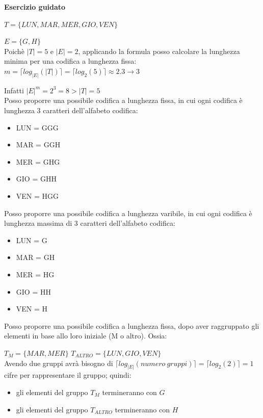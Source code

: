 \documentclass[11pt,fleqn]{book}
\begin{document}
\begin{esercizio}[1]
    \textbf{Esercizio guidato}

    $T = \{ LUN, MAR, MER, GIO, VEN \} $
    
    $E = \{ G, H \} $ \\

    Poichè $|T| = 5$ e $|E| = 2$, applicando la formula posso calcolare la lunghezza minima per una codifica a lunghezza fissa:
        $m = \lceil log_{|E|}{(|T|)} \rceil = \lceil log_2{(5)} \rceil \approx 2.3 \xrightarrow{} 3$
        
    Infatti  $|E|^{m} = 2^3 = 8 > |T| = 5$ \\

    Posso proporre una possibile codifica a lunghezza fissa, in cui ogni codifica è lunghezza 3 caratteri dell'alfabeto codifica:
    \begin{itemize}
        \item LUN = GGG
        \item MAR = GGH
        \item MER = GHG
        \item GIO = GHH
        \item VEN = HGG
    \end{itemize}
    \vspace{0.25cm}

    Posso proporre una possibile codifica a lunghezza varibile, in cui ogni codifica è lunghezza massima di 3 caratteri dell'alfabeto codifica:
    \begin{itemize}
        \item LUN = G
        \item MAR = GH
        \item MER = HG
        \item GIO = HH
        \item VEN = H
    \end{itemize}
    \vspace{0.25cm}

    Posso proporre una possibile codifica a lunghezza fissa, dopo aver raggruppato gli elementi in base allo loro iniziale (M o altro). Ossia:

    \hspace{2cm}
    $T_M = \{ MAR, MER \} $
    \hspace{2cm}
    $T_{ALTRO} = \{ LUN, GIO, VEN \} $\\

    Avendo due gruppi avrà bisogno di $\lceil log_{|E|}{(numero\ gruppi)} \rceil = \lceil log_2{(2)} \rceil = 1$ cifre per rappresentare il gruppo; quindi:
    \begin{itemize}
        \item gli elementi del gruppo $T_M$ termineranno con $G$
        \item gli elementi del gruppo $T_{ALTRO}$ termineranno con $H$
    \end{itemize}
    \vspace{0.25cm}
    

\end{esercizio}
\end{document}
